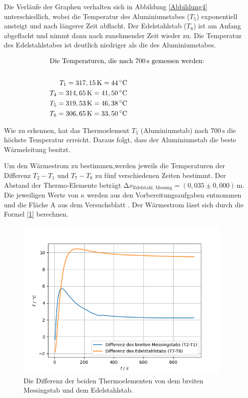 \begin{flushleft}
    Die Verläufe der Graphen verhalten sich in Abbildung \ref{Abbildung4} unterschiedlich, wobei die Temperatur des Aluminiumstabes ($T_{5}$) exponentiell ansteigt und nach längerer Zeit abflacht.
    Der Edelstahlstab ($T_{8}$) ist am Anfang abgeflacht und nimmt dann nach zunehmender Zeit wieder zu. Die Temperatur des Edelstahlstabes ist deutlich niedriger als die des Aluminiumstabes.
\end{flushleft}

\begin{align*}
    \intertext{Die Temperaturen, die nach 700\,\unit{\second} gemessen werden:} \\
    T_{1} = 317,15\,\unit{\kelvin} = 44\,\unit{\degreeCelsius}\\
    T_{4} = 314,65\,\unit{\kelvin} = 41,50\,\unit{\degreeCelsius}\\
    T_{5} = 319,53\,\unit{\kelvin} = 46,38\,\unit{\degreeCelsius}\\
    T_{8} = 306,65\,\unit{\kelvin} = 33,50\,\unit{\degreeCelsius}\\
\end{align*}

\begin{flushleft}
    Wie zu erkennen, hat das Thermoelement $T_{5}$ (Aluminiumstab) nach $700\,\unit{\second}$ die höchste Temperatur erreicht. 
    Daraus folgt, dass der Aluminiumstab die beste Wärmeleitung besitzt.
\end{flushleft}



\begin{flushleft}
    Um den Wärmestrom zu bestimmen,werden jeweils die Temperaturen der Differenz $ T_{2} - T_{1}$ und $ T_{7} - T_{8}$ zu fünf verschiedenen Zeiten bestimmt.
    Der Abstand der Thermo-Elemente beträgt $ \increment x_{\text{Edelstahl, Messing}} = (0,035 \pm 0,000)\,\unit{\meter} $.
    Die jeweiligen Werte von $\kappa$ werden aus den Vorbereitungsaufgaben entnommen und die Fläche A aus dem Versuchsblatt \cite{a1}. 
    Der Wärmestrom lässt sich durch die Formel \ref{1} berechnen.
\end{flushleft}

\begin{figure}[H]
    \centering
   \includegraphics[height=80mm]{bilder/Tempdiff.png}
    \caption{Die Differenz der beiden Thermoelementen von dem breiten Messingstab und dem Edelstahlstab. \label{Abbildung5} }
\end{figure}

